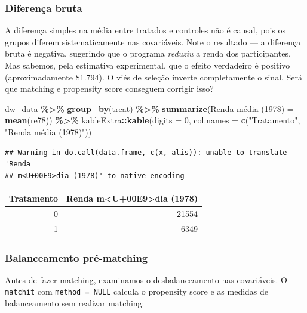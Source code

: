 \documentclass[
]{article}
\newenvironment{Shaded}{\begin{snugshade}}{\end{snugshade}}
\newcommand{\AttributeTok}[1]{\textcolor[rgb]{0.13,0.29,0.53}{#1}}
\newcommand{\DecValTok}[1]{\textcolor[rgb]{0.00,0.00,0.81}{#1}}
\newcommand{\FunctionTok}[1]{\textcolor[rgb]{0.13,0.29,0.53}{\textbf{#1}}}
\newcommand{\NormalTok}[1]{#1}
\newcommand{\OtherTok}[1]{\textcolor[rgb]{0.56,0.35,0.01}{#1}}
\newcommand{\SpecialCharTok}[1]{\textcolor[rgb]{0.81,0.36,0.00}{\textbf{#1}}}
\newcommand{\StringTok}[1]{\textcolor[rgb]{0.31,0.60,0.02}{#1}}
\begin{document}
\subsubsection{Diferença bruta}\label{diferenuxe7a-bruta}

A diferença simples na média entre tratados e controles não é causal, pois os grupos diferem sistematicamente nas covariáveis. Note o resultado --- a diferença bruta é negativa, sugerindo que o programa \emph{reduziu} a renda dos participantes. Mas sabemos, pela estimativa experimental, que o efeito verdadeiro é positivo (aproximadamente \$1.794). O viés de seleção inverte completamente o sinal. Será que matching e propensity score conseguem corrigir isso?

\begin{Shaded}
\begin{Highlighting}[]
\NormalTok{dw\_data }\SpecialCharTok{\%\textgreater{}\%}
    \FunctionTok{group\_by}\NormalTok{(treat) }\SpecialCharTok{\%\textgreater{}\%}
    \FunctionTok{summarize}\NormalTok{(}\StringTok{\textasciigrave{}}\AttributeTok{Renda média (1978)}\StringTok{\textasciigrave{}} \OtherTok{=} \FunctionTok{mean}\NormalTok{(re78)) }\SpecialCharTok{\%\textgreater{}\%}
\NormalTok{    kableExtra}\SpecialCharTok{::}\FunctionTok{kable}\NormalTok{(}\AttributeTok{digits =} \DecValTok{0}\NormalTok{, }\AttributeTok{col.names =} \FunctionTok{c}\NormalTok{(}\StringTok{"Tratamento"}\NormalTok{, }\StringTok{"Renda média (1978)"}\NormalTok{))}
\end{Highlighting}
\end{Shaded}

\begin{verbatim}
## Warning in do.call(data.frame, c(x, alis)): unable to translate 'Renda
## m<U+00E9>dia (1978)' to native encoding
\end{verbatim}

\begin{tabular}{r|r}
\hline
Tratamento & Renda m<U+00E9>dia (1978)\\
\hline
0 & 21554\\
\hline
1 & 6349\\
\hline
\end{tabular}

\subsubsection{Balanceamento pré-matching}\label{balanceamento-pruxe9-matching}

Antes de fazer matching, examinamos o desbalanceamento nas covariáveis. O \texttt{matchit} com \texttt{method\ =\ NULL} calcula o propensity score e as medidas de balanceamento sem realizar matching:
\end{document}
